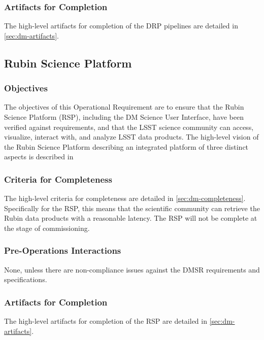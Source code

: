 \subsubsection{Artifacts for Completion}
The high-level artifacts for completion of the DRP pipelines are detailed in \ref{sec:dm-artifacts}.

\subsection{Rubin Science Platform}

\subsubsection{Objectives}
The objectives of this Operational Requirement are to ensure that the Rubin Science Platform (RSP), including the DM Science User Interface, have been verified against requirements, and that the LSST science community can access, visualize, interact with, and analyze LSST data products.
The high-level vision of the Rubin Science Platform describing an integrated platform of three distinct aspects is described in 

\subsubsection{Criteria for Completeness}
The high-level criteria for completeness are detailed in \ref{sec:dm-completeness}.
Specifically for the RSP, this means that the scientific community can retrieve the Rubin data products with a reasonable latency. The RSP will not be complete at the stage of commissioning.

\subsubsection{Pre-Operations Interactions}
None, unless there are non-compliance issues against the DMSR requirements and specifications.

\subsubsection{Artifacts for Completion}
The high-level artifacts for completion of the RSP are detailed in \ref{sec:dm-artifacts}.